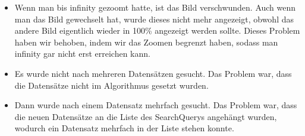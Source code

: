 \begin{itemize}
\item Wenn man bis infinity gezoomt hatte, ist das Bild verschwunden. Auch wenn man das Bild gewechselt hat, wurde dieses nicht mehr angezeigt, obwohl das andere Bild eigentlich wieder in 100\% angezeigt werden sollte. Dieses Problem haben wir behoben, indem wir das Zoomen begrenzt haben, sodass man infinity gar nicht erst erreichen kann.
\item Es wurde nicht nach mehreren Datensätzen gesucht. Das Problem war, dass die Datensätze nicht im Algorithmus gesetzt wurden.
\item Dann wurde nach einem Datensatz mehrfach gesucht. Das Problem war, dass die neuen Datensätze an die Liste des SearchQuerys angehängt wurden, wodurch ein Datensatz mehrfach in der Liste stehen konnte.
\end{itemize}
